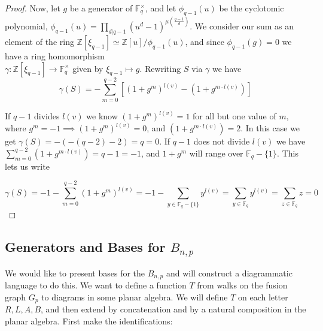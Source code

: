 \documentclass[11pt]{article} %
\begin{document}
\begin{proposition}
\begin{proof}
Now, let $g$ be a generator of $\mathbb{F}_q^{\times}$, and let $\phi_{q-1}(u)$ be the cyclotomic polynomial, $\phi_{q-1}(u) = \prod_{d|q-1}{(u^d-1)^{\mu(\frac{q-1}{d})}}$. We consider our sum as an element of the ring $\mathbb{Z}[\xi_{q-1}] \simeq \mathbb{Z}[u]/ \phi_{q-1}(u)$, and since $\phi_{q-1}(g)=0$ we have a ring homomorphism \\ $\gamma: \mathbb{Z}[\xi_{q-1}] \rightarrow \mathbb{F}_q^{\times}$ given by $\xi_{q-1} \mapsto g$. Rewriting $S$ via $\gamma$ we have
$$
\gamma(S) = - \sum_{m=0}^{q-2}[(1+g^m)^{l(v)}-(1 + g^{m \cdot l(v)})]
$$

If $q-1$ divides $l(v)$ we know $(1 + g^m)^{l(v)} = 1$ for all but one value of $m$, where $g^m=-1 \implies (1+g^m)^{l(v)}=0$, and $(1+g^{m\cdot l(v)}) = 2$. In this case we get $\gamma(S) = - (-(q-2)-2) = q = 0$.  If $q-1$ does not divide $l(v)$ we have $\sum_{m=0}^{q-2}(1+g^{m\cdot l(v)}) = q-1 = -1$, and $1 + g^m$ will range over $\mathbb{F}_q - \{1\}$. This lets us write

$$
\gamma(S) = -1-\sum_{m=0}^{q-2}(1+g^m)^{l(v)}=-1-\sum_{y \in \mathbb{F}_q-\{1\}}{y^{l(v)}} = \sum_{y \in \mathbb{F}_q}{y^{l(v)}}=\sum_{z \in \mathbb{F}_q}{z} = 0 
$$ 

\end{proof}
\end{proposition}

\subsection{Generators and Bases for $B_{n,p}$}

We would like to present bases for the $B_{n,p}$ and will construct a diagrammatic language to do this. We want to define a function $T$ from walks on the fusion graph $G_p$ to diagrams in some planar algebra. We will define $T$ on each letter $R,L,A,B$, and then extend by concatenation and by a natural composition in the planar algebra. First make the identifications:


\newcommand{\lp}[5]{
\begin{scope}[decoration={
    markings,
    mark=at position 0.5 with {\arrow{Latex}}}
    ] 
\foreach \y in {1,...,#1}{
\draw [-,postaction={decorate}] ({#3+2-.125*(#1-1)+.25*#5*(\y-1)},#4) to [out=90, in=180] (#3+4,{#4+2.5-.25*#5*(\y-1)-#2*.25*#5});
}
\foreach \x in {1,...,#2}{
\draw [-,postaction={decorate}] (#3,{#4+2.5-.25*#5*(\x-1)}) to (#3+4,{#4+2.5-.25*#5*(\x-1)});
}
\end{scope}
}
\newcommand{\rp}[5]{
\begin{scope}[decoration={
    markings,
    mark=at position 0.25 with {\arrow{latex}}}]
\foreach \y in {1,...,#1}{
\draw [-,postaction={decorate}] ({#3+2-.125*(#1-1)+.25*#5*(\y-1)},#4) to [out=90, in=180] (#3+4,{#4+2.5-.25*#5*(\y-1)-#2*.25*#5});
}
\ifnum#2>0
\foreach \x in {1,...,#2}{
\draw [-,postaction={decorate}] (#3,{#4+2.5-.25*#5*(\x-1)}) to (#3+4,{#4+2.5-.25*#5*(\x-1)});
}
\fi
\end{scope}
}
\end{document}
